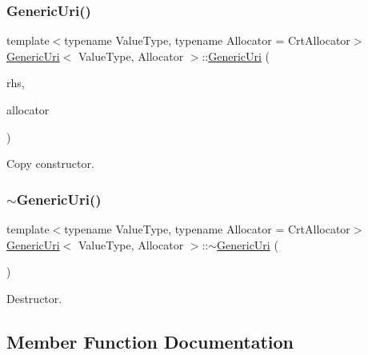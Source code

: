 \subsubsection{\texorpdfstring{Generic\+Uri()}{GenericUri()}\hspace{0.1cm}{\footnotesize\ttfamily [6/6]}}
{\footnotesize\ttfamily template$<$typename Value\+Type, typename Allocator = Crt\+Allocator$>$ \\
\hyperlink{classGenericUri}{Generic\+Uri}$<$ Value\+Type, Allocator $>$\+::\hyperlink{classGenericUri}{Generic\+Uri} (\begin{DoxyParamCaption}\item[{const \hyperlink{classGenericUri}{Generic\+Uri}$<$ Value\+Type, Allocator $>$ \&}]{rhs,  }\item[{Allocator $\ast$}]{allocator }\end{DoxyParamCaption})\hspace{0.3cm}{\ttfamily [inline]}}



Copy constructor. 

\mbox{\label{classGenericUri_a6479d97f05ba77b27f06778ce17590d0}} 
\subsubsection{\texorpdfstring{$\sim$\+Generic\+Uri()}{~GenericUri()}}
{\footnotesize\ttfamily template$<$typename Value\+Type, typename Allocator = Crt\+Allocator$>$ \\
\hyperlink{classGenericUri}{Generic\+Uri}$<$ Value\+Type, Allocator $>$\+::$\sim$\hyperlink{classGenericUri}{Generic\+Uri} (\begin{DoxyParamCaption}{ }\end{DoxyParamCaption})\hspace{0.3cm}{\ttfamily [inline]}}



Destructor. 



\subsection{Member Function Documentation}
\mbox{\label{classGenericUri_a408da6c9ee1bdbc8502ea9bcabf6ab72}} 
